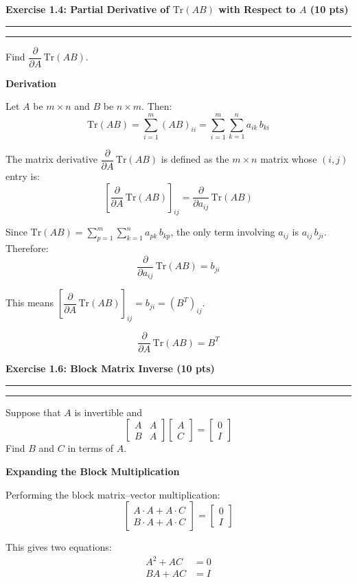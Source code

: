 \documentclass[12pt]{article}
\newcommand{\question}[1]{%
  \clearpage
  \vspace{0.5cm}
  {\noindent\normalsize \textbf{#1}}
  \vspace{0.2cm}
  \hrule
  \vspace{0.1cm}
  \hrule
  \vspace{0.3cm}
}
\begin{document}
\question{Exercise 1.4: Partial Derivative of $\mathrm{Tr}(AB)$ with Respect to $A$ (10 pts)}\label{quest:1.4}

Find $\dfrac{\partial}{\partial A}\,\mathrm{Tr}(AB)$.

\begin{stepbox}
\textbf{Derivation}

Let $A$ be $m \times n$ and $B$ be $n \times m$. Then:
\[
\mathrm{Tr}(AB) = \sum_{i=1}^{m} (AB)_{ii} = \sum_{i=1}^{m} \sum_{k=1}^{n} a_{ik}\, b_{ki}
\]

The matrix derivative $\dfrac{\partial}{\partial A}\,\mathrm{Tr}(AB)$ is defined as the $m \times n$ matrix whose $(i,j)$ entry is:
\[
\left[\frac{\partial}{\partial A}\,\mathrm{Tr}(AB)\right]_{ij} = \frac{\partial}{\partial a_{ij}}\,\mathrm{Tr}(AB)
\]

Since $\mathrm{Tr}(AB) = \sum_{p=1}^{m}\sum_{k=1}^{n} a_{pk}\,b_{kp}$, the only term involving $a_{ij}$ is $a_{ij}\,b_{ji}$. Therefore:
\[
\frac{\partial}{\partial a_{ij}}\,\mathrm{Tr}(AB) = b_{ji}
\]

This means $\left[\dfrac{\partial}{\partial A}\,\mathrm{Tr}(AB)\right]_{ij} = b_{ji} = (B^T)_{ij}$.
\end{stepbox}

\begin{resultsbox}
\[
\boxed{\frac{\partial}{\partial A}\,\mathrm{Tr}(AB) = B^T}
\]
\end{resultsbox}


\question{Exercise 1.6: Block Matrix Inverse (10 pts)}\label{quest:1.6}

Suppose that $A$ is invertible and
\[
\begin{bmatrix} A & A \\ B & A \end{bmatrix}
\begin{bmatrix} A \\ C \end{bmatrix}
=
\begin{bmatrix} 0 \\ I \end{bmatrix}
\]
Find $B$ and $C$ in terms of $A$.

\begin{stepbox}
\textbf{Expanding the Block Multiplication}

Performing the block matrix--vector multiplication:
\[
\begin{bmatrix} A \cdot A + A \cdot C \\ B \cdot A + A \cdot C \end{bmatrix}
=
\begin{bmatrix} 0 \\ I \end{bmatrix}
\]

This gives two equations:
\begin{align}
A^2 + AC &= 0 \tag{i}\\
BA + AC &= I \tag{ii}
\end{align}
\end{stepbox}
\end{document}
